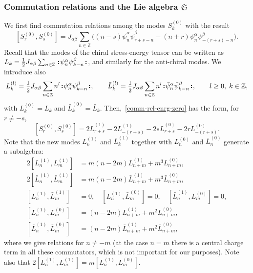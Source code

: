 \documentclass[11pt]{article}
\newcommand{\ffrac}[2]{\mbox{\footnotesize$\displaystyle\frac{#1}{#2}$}}
\newcommand{\half}{%
  \mathchoice{\ffrac{1}{2}}{\frac{1}{2}}{\frac{1}{2}}{\frac{1}{2}}}
\newcommand{\sferm}{\psi}
\newcommand{\bsferm}{\bar{\psi}}
\newcommand{\oZ}{\mathbb{Z}}
\newcommand{\interLie}{\mathfrak{S}}
\newcommand{\interch}{\interLie}
\newcommand{\enrg}{S}
\newcommand{\virm}[1]{L^{(#1)}}
\newcommand{\bvirm}[1]{\bar{L}^{(#1)}}
\newcommand{\nord}[1]{\boldsymbol{\colon}\!\!{#1}\boldsymbol{\colon}\!\!}
\theoremstyle{definition}
\begin{document}
\subsubsection{Commutation relations and the Lie algebra $\interch$}
\label{sec:comm-rel-interch}
We first find commutation relations among the modes $\enrg^{(0)}_k$
with the result
\begin{equation}\label{comm-rel-enrg-zero}
[\enrg^{(0)}_r,\enrg^{(0)}_s] =
J_{\alpha\beta}\sum_{n\in\oZ}\bigl((n-s)\bsferm^{\alpha}_{n}\bsferm^{\beta}_{r+s-n}
 - (n+r)\sferm^{\alpha}_{n}\sferm^{\beta}_{-(r+s)-n}\bigr).
\end{equation}
Recall that the modes of the chiral stress-energy
tensor can be written as $L_k=\half
J_{\alpha\beta}\sum_{n\in\oZ}\nord{\sferm^{\alpha}_{n}\sferm^{\beta}_{k-n}}$,
and similarly for the anti-chiral modes. We introduce also
\begin{equation}\label{virm-def}
\virm{l}_k =
\half J_{\alpha\beta}\sum_{n\in\oZ} n^l
\nord{\sferm^{\alpha}_{n}\sferm^{\beta}_{k-n}}, \qquad
\bvirm{l}_k =
\half J_{\alpha\beta}\sum_{n\in\oZ} n^l \nord{\bsferm^{\alpha}_{n}\bsferm^{\beta}_{k-n}},\qquad l\geq0,\; k\in\oZ,
\end{equation}
with $\virm{0}_k=L_k$ and $\bvirm{0}_k=\bar{L}_k$.
Then,~\eqref{comm-rel-enrg-zero} has the form, for $r\ne-s$,
\begin{equation}\label{enrg-enrg}
[\enrg^{(0)}_r,\enrg^{(0)}_s] = 2\bvirm{1}_{r+s} - 2 \virm{1}_{-(r+s)} - 2s
\bvirm{0}_{r+s} - 2r \virm{0}_{-(r+s)}.
\end{equation}
Note that the new modes $\virm{1}_k$ and $\bvirm{1}_k$
together with $\virm{0}_n$ and $\bvirm{0}_n$ generate a subalgebra:
\begin{align}
2[\virm{1}_n, \virm{1}_m] &= m(n-2m) \virm{1}_{n+m} + m^3 \virm{0}_{n+m},\\
2[\bvirm{1}_n,\bvirm{1}_m] &= m(n-2m) \bvirm{1}_{n+m} + m^3 \bvirm{0}_{n+m},\\
[\virm{1}_n,\bvirm{1}_m]&=0,\quad [\virm{1}_n,\bvirm{0}_m]=0,\quad [\bvirm{1}_n,\virm{0}_m]=0,\\
[\virm{1}_n,\virm{0}_m] &= (n-2m) \virm{1}_{n+m} + m^2 \virm{0}_{n+m},\\
[\bvirm{1}_n,\bvirm{0}_m] &= (n-2m) \bvirm{1}_{n+m} + m^2 \bvirm{0}_{n+m},
\end{align}
where we  give relations for $n\ne-m$ (at the case $n=m$ there is a central charge term in all these commutators, which is not important for our purposes).
Note also that $2[\virm{1}_n,\virm{1}_m] = m[\virm{1}_n,\virm{0}_m]$.
\end{document}
